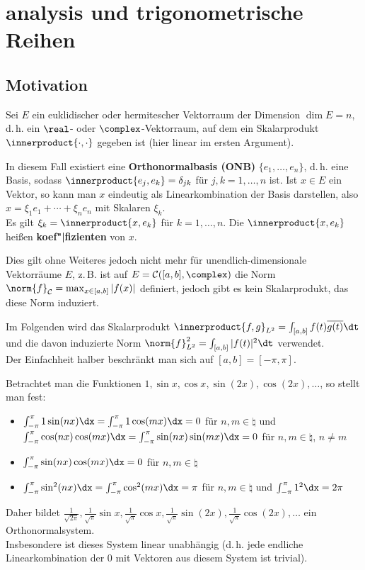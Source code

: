 \chapter{%
    analysis und trigonometrische Reihen%
}

\section{%
    Motivation%
}

Sei $E$ ein euklidischer oder hermitescher Vektorraum der Dimension
$\dim E = n$, d.\,h. ein $\real$- oder $\complex$-Vektorraum, auf dem
ein Skalarprodukt $\innerproduct{\cdot, \cdot}$ gegeben ist
(hier linear im ersten Argument).

In diesem Fall existiert eine \textbf{Orthonormalbasis (ONB)}
$\{e_1, \dotsc, e_n\}$, d.\,h. eine Basis, sodass
$\innerproduct{e_j, e_k} = \delta_{jk}$ für $j, k = 1, \dotsc, n$ ist.
Ist $x \in E$ ein Vektor, so kann man $x$ eindeutig als Linearkombination
der Basis darstellen, also $x = \xi_1 e_1 + \dotsb + \xi_n e_n$
mit Skalaren $\xi_k$.\\
Es gilt $\xi_k = \innerproduct{x, e_k}$ für $k = 1, \dotsc, n$.
Die $\innerproduct{x, e_k}$ heißen \textbf{koef"|fizienten} von $x$.

Dies gilt ohne Weiteres jedoch nicht mehr für unendlich-dimensionale
Vektorräume $E$, z.\,B. ist auf $E = \C([a, b], \complex)$ die Norm
$\norm{f}_\C = \max_{x \in [a, b]} |f(x)|$ definiert, jedoch gibt es kein
Skalarprodukt, das diese Norm induziert.

\linie

Im Folgenden wird das Skalarprodukt
$\innerproduct{f, g}_{L^2} = \int_{[a, b]} f(t) \overline{g(t)} \dt$ und die davon
induzierte Norm $\norm{f}_{L^2}^2 = \int_{[a, b]} |f(t)|^2 \dt$ verwendet.\\
Der Einfachheit halber beschränkt man sich auf $[a, b] = [-\pi, \pi]$.

Betrachtet man die Funktionen $1, \sin x, \cos x, \sin(2x), \cos(2x), \dotsc$,
so stellt man fest:
\begin{itemize}
    \item
    $\int_{-\pi}^\pi 1\sin(nx)\dx = \int_{-\pi}^\pi 1\cos(mx)\dx = 0$
    für $n, m \in \natural$ und\\
    $\int_{-\pi}^\pi \cos(nx)\cos(mx)\dx = \int_{-\pi}^\pi \sin(nx)\sin(mx)\dx =
    0$
    für $n, m \in \natural$, $n \not= m$

    \item
    $\int_{-\pi}^\pi \sin(nx)\cos(mx)\dx = 0$ für $n, m \in \natural$

    \item
    $\int_{-\pi}^\pi \sin^2(nx)\dx = \int_{-\pi}^\pi \cos^2(mx)\dx = \pi$
    für $n, m \in \natural$ und
    $\int_{-\pi}^\pi 1^2 \dx = 2\pi$
\end{itemize}
Daher bildet $\frac{1}{\sqrt{2\pi}}, \frac{1}{\sqrt{\pi}} \sin x,
\frac{1}{\sqrt{\pi}} \cos x, \frac{1}{\sqrt{\pi}} \sin(2x),
\frac{1}{\sqrt{\pi}} \cos(2x), \dotsc$ ein
Orthonormalsystem.\\
Insbesondere ist dieses System linear unabhängig
(d.\,h. jede endliche Linearkombination der $0$ mit Vektoren aus diesem System
ist trivial).

